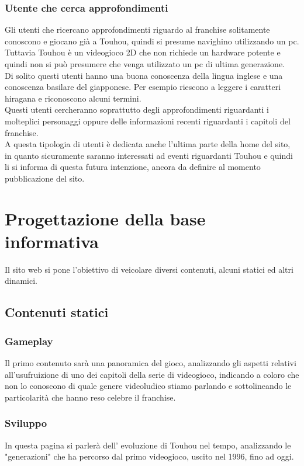 \documentclass[openany, a4paper, 12pt]{report}
\begin{document}
		\subsubsection{Utente che cerca approfondimenti}
		Gli utenti che ricercano approfondimenti riguardo al franchise solitamente conoscono e giocano già a Touhou, quindi si presume navighino utilizzando un pc. Tuttavia Touhou è un videogioco 2D che non richiede un hardware potente e quindi non si può presumere che venga utilizzato un pc di ultima generazione.\\
		Di solito questi utenti hanno una buona conoscenza della lingua inglese e una conoscenza basilare del giapponese. Per esempio riescono a leggere i caratteri hiragana e riconoscono alcuni termini.\\
		Questi utenti cercheranno soprattutto degli approfondimenti riguardanti i molteplici personaggi oppure delle informazioni recenti riguardanti i capitoli del franchise.\\
		A questa tipologia di utenti è dedicata anche l'ultima parte della home del sito, in quanto sicuramente saranno interessati ad eventi riguardanti Touhou e quindi li si informa di questa futura intenzione, ancora da definire al momento pubblicazione del sito.

	\section{Progettazione della base informativa}
		Il sito web si pone l'obiettivo di veicolare diversi contenuti, alcuni statici ed altri dinamici.
	\subsection{Contenuti statici}
		\subsubsection{Gameplay}
		Il primo contenuto sarà una panoramica del gioco, analizzando gli aspetti relativi all'usufruizione di uno dei capitoli della serie di videogioco, indicando a coloro che non lo conoscono di quale genere videoludico stiamo parlando e sottolineando le particolarità che hanno reso celebre il franchise.
		\subsubsection{Sviluppo}
		In questa pagina si parlerà dell' evoluzione di Touhou nel tempo, analizzando le "generazioni" che ha percorso dal primo videogioco, uscito nel 1996, fino ad oggi.
\end{document}
